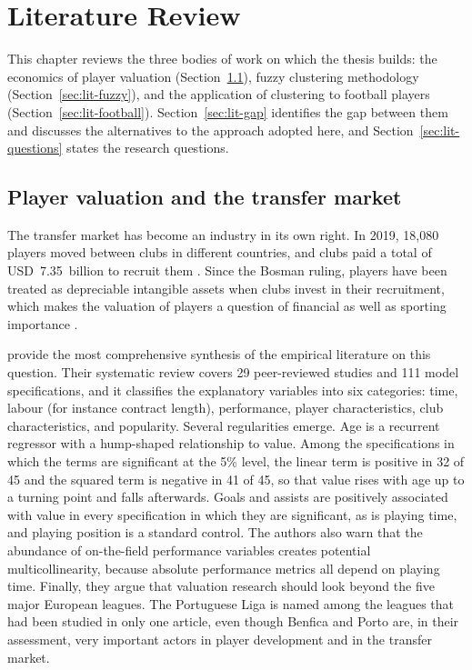 \chapter{Literature Review}
\label{ch:literature}

This chapter reviews the three bodies of work on which the thesis builds: the economics of player valuation (Section~\ref{sec:lit-valuation}), fuzzy clustering methodology (Section~\ref{sec:lit-fuzzy}), and the application of clustering to football players (Section~\ref{sec:lit-football}). Section~\ref{sec:lit-gap} identifies the gap between them and discusses the alternatives to the approach adopted here, and Section~\ref{sec:lit-questions} states the research questions.

\section{Player valuation and the transfer market}
\label{sec:lit-valuation}

The transfer market has become an industry in its own right. In 2019, 18,080 players moved between clubs in different countries, and clubs paid a total of USD~7.35~billion to recruit them \cite{franceschi2024determinants}. Since the Bosman ruling, players have been treated as depreciable intangible assets when clubs invest in their recruitment, which makes the valuation of players a question of financial as well as sporting importance \cite{franceschi2024determinants}.

 provide the most comprehensive synthesis of the empirical literature on this question. Their systematic review covers 29 peer-reviewed studies and 111 model specifications, and it classifies the explanatory variables into six categories: time, labour (for instance contract length), performance, player characteristics, club characteristics, and popularity. Several regularities emerge. Age is a recurrent regressor with a hump-shaped relationship to value. Among the specifications in which the terms are significant at the 5\% level, the linear term is positive in 32 of 45 and the squared term is negative in 41 of 45, so that value rises with age up to a turning point and falls afterwards. Goals and assists are positively associated with value in every specification in which they are significant, as is playing time, and playing position is a standard control. The authors also warn that the abundance of on-the-field performance variables creates potential multicollinearity, because absolute performance metrics all depend on playing time. Finally, they argue that valuation research should look beyond the five major European leagues. The Portuguese Liga is named among the leagues that had been studied in only one article, even though Benfica and Porto are, in their assessment, very important actors in player development and in the transfer market.

